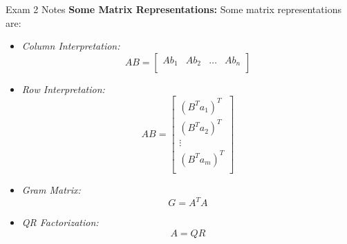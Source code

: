 \begin{cheatsheet}{Exam 2 Notes}
    \textbf{Some Matrix Representations:} Some matrix representations are:
    \begin{itemize}
        \item \textit{Column Interpretation:}
        \begin{equation*}
            AB = 
            \begin{bmatrix}
                Ab_{1} & Ab_{2} & \dots & Ab_{n} \\
            \end{bmatrix}
        \end{equation*}
        \item \textit{Row Interpretation:}
        \begin{equation*}
            AB = 
            \begin{bmatrix}
                (B^{T}a_{1})^{T} \\
                (B^{T}a_{2})^{T} \\
                \vdots \\
                (B^{T}a_{m})^{T} \\
            \end{bmatrix}
        \end{equation*}
        \item \textit{Gram Matrix:}
        \begin{equation*}
            G = A^{T}A
        \end{equation*}
        \item \textit{QR Factorization:}
        \begin{equation*}
            A = QR
        \end{equation*}
    \end{itemize}


\end{cheatsheet}
